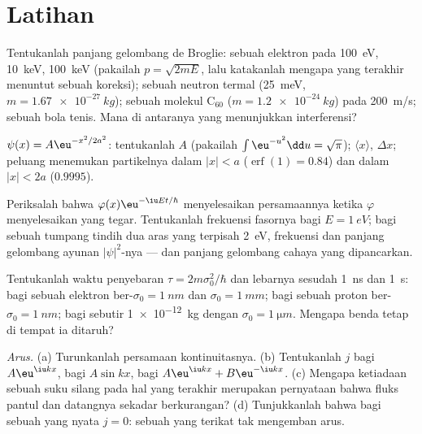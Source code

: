 \section{Latihan}

\begin{exercise}[$\star$]\label{exo:b2:schrodinger-wave-functions:1}
Tentukanlah panjang gelombang de Broglie: sebuah elektron pada \qty{100}{eV}, \qty{10}{keV},
\qty{100}{keV} (pakailah $p = \sqrt{2mE}$, lalu katakanlah mengapa yang terakhir menuntut sebuah
koreksi); sebuah neutron termal (\qty{25}{meV}, $m = \qty{1.67e-27}{kg}$); sebuah
molekul C$_{60}$ ($m = \qty{1.2e-24}{kg}$) pada \qty{200}{m/s}; sebuah bola
tenis. Mana di antaranya yang menunjukkan interferensi?
\end{exercise}

\begin{exercise}[$\star$]\label{exo:b2:schrodinger-wave-functions:2}
$\psi(x) = A\eu^{-x^2/2a^2}$: tentukanlah $A$ (pakailah $\int\eu^{-u^2}\dd u = \sqrt\pi$);
$\langle x\rangle$, $\Delta x$; peluang menemukan partikelnya dalam
$|x| < a$ ($\operatorname{erf}(1) = 0.84$) dan dalam $|x| < 2a$ ($0.9995$).
\end{exercise}

\begin{exercise}[$\star$]\label{exo:b2:schrodinger-wave-functions:3}
Periksalah bahwa $\varphi(x)\eu^{-\iu Et/\hbar}$ menyelesaikan persamaannya ketika $\varphi$
menyelesaikan yang tegar. Tentukanlah frekuensi fasornya bagi $E = \qty{1}{eV}$;
bagi sebuah tumpang tindih dua aras yang terpisah \qty{2}{eV}, frekuensi dan
panjang gelombang ayunan $|\psi|^2$-nya --- dan panjang gelombang cahaya yang
dipancarkan.
\end{exercise}

\begin{exercise}[$\star$]\label{exo:b2:schrodinger-wave-functions:4}
Tentukanlah waktu penyebaran $\tau = 2m\sigma_0^2/\hbar$ dan lebarnya sesudah \qty{1}{ns} dan
\qty{1}{s}: bagi sebuah elektron ber-$\sigma_0 = \qty{1}{nm}$ dan $\sigma_0 = \qty{1}{mm}$;
bagi sebuah proton ber-$\sigma_0 = \qty{1}{nm}$; bagi sebutir \qty{1e-12}{kg} dengan
$\sigma_0 = \qty{1}{\micro m}$. Mengapa benda tetap di tempat ia ditaruh?
\end{exercise}

\begin{exercise}[$\star\star$]\label{exo:b2:schrodinger-wave-functions:5}
\emph{Arus.} (a) Turunkanlah persamaan kontinuitasnya. (b) Tentukanlah $j$ bagi
$A\eu^{\iu kx}$, bagi $A\sin kx$, bagi $A\eu^{\iu kx} + B\eu^{-\iu kx}$. (c) Mengapa
ketiadaan sebuah suku silang pada hal yang terakhir merupakan pernyataan bahwa
fluks pantul dan datangnya sekadar berkurangan? (d) Tunjukkanlah bahwa bagi sebuah  yang nyata $j = 0$: sebuah  yang terikat tak mengemban arus.
\end{exercise}

